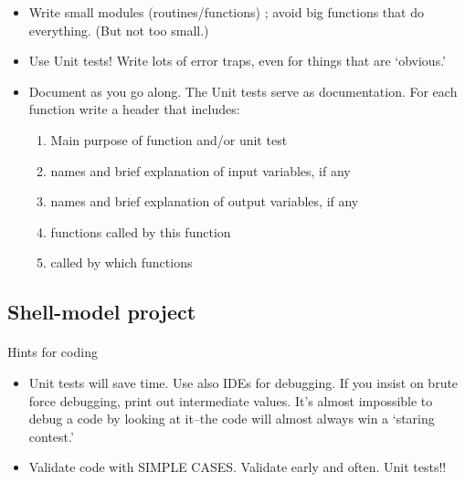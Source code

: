 \documentclass[%
oneside,                 %
final,                   %
10pt]{article}
\begin{document}
\begin{itemize}
\item Write small modules (routines/functions) ; avoid big functions  that do everything. (But not too small.)

\item Use Unit tests! Write lots of error traps, even for things that are `obvious.'

\item Document as you go along. The Unit tests serve as documentation. For each function write a header that includes: 
\begin{enumerate}

\item Main purpose of function and/or unit test

\item names and  brief explanation of input variables, if any 

\item names and brief explanation of output variables, if any

\item functions called by this function

\item called by which functions
\end{enumerate}

\noindent
\end{itemize}

\noindent



\subsection*{Shell-model project}

\paragraph{}

Hints for coding

\begin{itemize}
\item Unit tests will save time. Use also IDEs for debugging. If you insist on brute force debugging, print out intermediate values. It's almost impossible to debug a  code by looking at it--the code will almost always win a `staring contest.'

\item Validate code with SIMPLE CASES. Validate early and often.  Unit tests!! 
\end{itemize}
\end{document}
